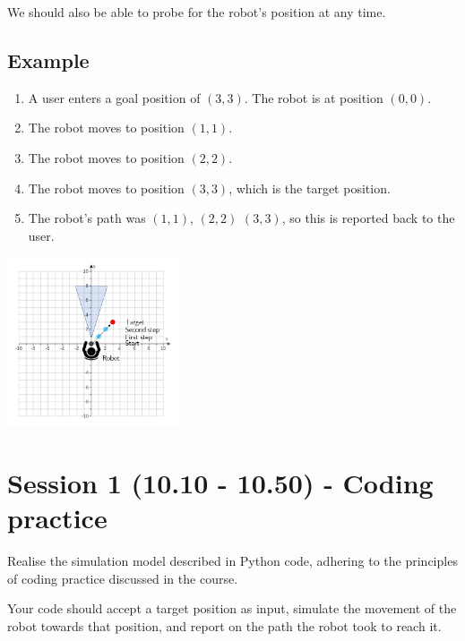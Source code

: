 \documentclass{article}
\begin{document}
We should also be able to probe for the robot's position at any time.

\subsection{Example}

\begin{enumerate}

    \item A user enters a goal position of $(3, 3)$. The robot is at position $(0, 0)$.

    \item The robot moves to position $(1, 1)$.

    \item The robot moves to position $(2, 2)$.

    \item The robot moves to position $(3, 3)$, which is the target position.

    \item The robot's path was $(1, 1)$, $(2, 2)$ $(3, 3)$, so this is reported back to the user.

\end{enumerate}

\begin{center}
  \includegraphics[height=5cm]{movement.png}
\end{center}

\section{Session 1 (10.10 - 10.50) - Coding practice}

Realise the simulation model described in Python code, adhering to the principles of coding practice discussed in the course.

Your code should accept a target position as input, simulate the movement of the robot towards that position, and report on the path the robot took to reach it.
\end{document}
